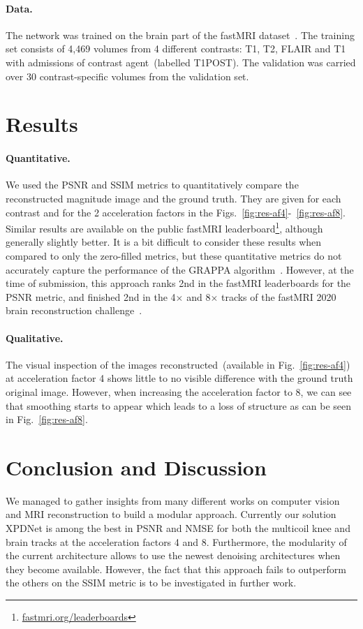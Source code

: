 \documentclass{article}
\begin{document}
\paragraph{Data.} The network was trained on the brain part of the fastMRI dataset~\cite{Zbontar}.
The training set consists of 4,469 volumes from 4 different contrasts: T1, T2, FLAIR and T1 with admissions of contrast agent~(labelled T1POST). The validation was carried over 30 contrast-specific volumes from the validation set.


\section{Results}

\paragraph{Quantitative.}
We used the PSNR and SSIM metrics to quantitatively compare the reconstructed magnitude image and the ground truth.
They are given for each contrast and for the 2 acceleration factors in the Figs.~\ref{fig:res-af4}-~\ref{fig:res-af8}.
Similar results are available on the public fastMRI leaderboard\footnote{\href{https://fastmri.org/leaderboards/}{fastmri.org/leaderboards}}, although generally slightly better.
It is a bit difficult to consider these results when compared to only the zero-filled metrics, but these quantitative metrics do not accurately capture the performance of the GRAPPA algorithm~\cite{Griswold2002GeneralizedGRAPPA}.
However, at the time of submission, this approach ranks 2nd in the fastMRI leaderboards for the PSNR metric, and finished 2nd in the 4$\times$ and 8$\times$ tracks of the fastMRI 2020 brain reconstruction challenge~\cite{Muckley2020State-of-the-artChallenge}.

\paragraph{Qualitative.}
The visual inspection of the images reconstructed~(available in Fig.~\ref{fig:res-af4}) at acceleration factor 4 shows little to no visible difference with the ground truth original image.
However, when increasing the acceleration factor to 8, we can see that smoothing starts to appear which leads to a loss of structure as can be seen in Fig.~\ref{fig:res-af8}.

\section{Conclusion and Discussion}
We managed to gather insights from many different works on computer vision and MRI reconstruction to build a modular approach.
Currently our solution XPDNet is among the best in PSNR and NMSE for both the multicoil knee and brain tracks at the acceleration factors 4 and 8.
Furthermore, the modularity of the current architecture allows to use the newest denoising architectures when they become available.
However, the fact that this approach fails to outperform the others on the SSIM metric is to be investigated in further work.
\end{document}

